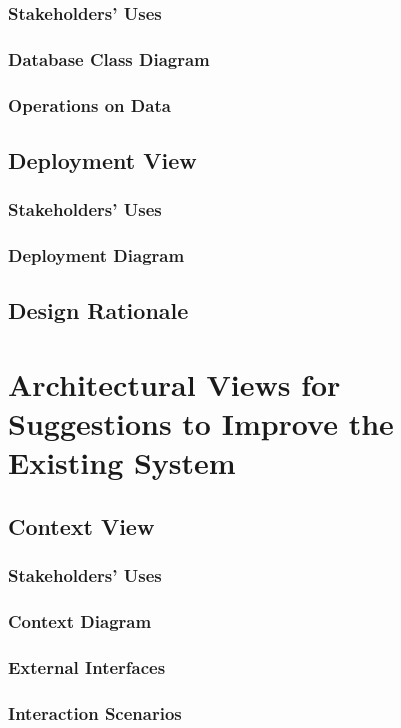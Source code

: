 \documentclass[a4paper]{article}
\begin{document}
    \subsubsection{Stakeholders' Uses}
    \lipsum[1-1]
    \subsubsection{Database Class Diagram}
    \subsubsection{Operations on Data}
    \lipsum[1-1]
    \subsection{Deployment View}
    \subsubsection{Stakeholders' Uses}
    \lipsum[1-1]
    \subsubsection{Deployment Diagram}
    \subsection{Design Rationale}
    \lipsum[1-1]

    \section{Architectural Views for Suggestions to Improve the Existing System}
    \subsection{Context View}
    \subsubsection{Stakeholders' Uses}
    \lipsum[1-1]
    \subsubsection{Context Diagram}
    \subsubsection{External Interfaces}
    \lipsum[1-1]
    \subsubsection{Interaction Scenarios}
    \lipsum[1-1]
\end{document}
